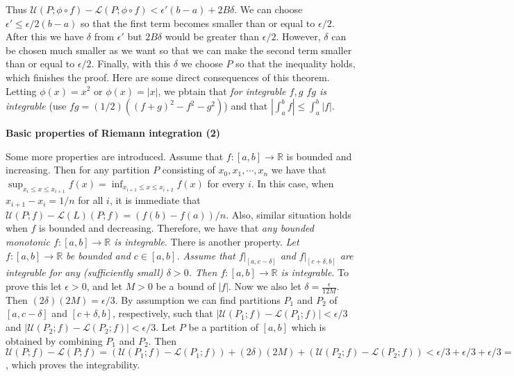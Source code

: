 \documentclass{article}
\newcommand{\ReR}{\mathbb{R}}
\begin{document}
Thus $\mathcal{U}(P; \phi \circ f) - \mathcal{L}(P; \phi \circ f) < \epsilon' (b - a) + 2B \delta$.
We can choose $\epsilon' \le \epsilon/2(b - a)$ so that the first term becomes smaller than or equal to $\epsilon/2$.
After this we have $\delta$ from $\epsilon'$ but $2B \delta$ would be greater than $\epsilon/2$.
However, $\delta$ can be chosen much smaller as we want so that we can make the second term smaller than or equal to $\epsilon/2$.
Finally, with this $\delta$ we choose $P$ so that the inequality holds, which finishes the proof.
Here are some direct consequences of this theorem.
Letting $\phi(x) = x^2$ or $\phi(x) = |x|$, we pbtain that \textit{for integrable $f, g$ $fg$ is integrable} (use $fg = (1/2)((f + g)^2 - f^2 - g^2)$) and that \textit{$|\int_a^b f| \le \int_a^b |f|$}.

\newpage

\textbf{Basic properties of Riemann integration (2)}

Some more properties are introduced.
Assume that $f : [a, b] \to \ReR$ is bounded and increasing.
Then for any partition $P$ consisting of $x_0, x_1, \cdots, x_n$ we have that $\sup_{x_i \le x \le x_{i + 1}} f(x) = \inf_{x_{i + 1} \le x \le x_{i + 2}} f(x)$ for every $i$.
In this case, when $x_{i + 1} - x_i = 1/n$ for all $i$, it is immediate that $\mathcal{U}(P; f) - \mathcal{L}(L)(P; f) = (f(b) - f(a))/n$.
Also, similar situation holds when $f$ is bounded and decreasing.
Therefore, we have that \textit{any bounded monotonic $f : [a, b] \to \ReR$ is integrable}.
There is another property.
\textit{Let $f : [a, b] \to \ReR$ be bounded and $c \in [a, b]$.
Assume that $f|_{[a, c - \delta]}$ and $f|_{[c + \delta, b]}$ are integrable for any (sufficiently small) $\delta > 0$.
Then $f : [a, b] \to \ReR$ is integrable}.
To prove this let $\epsilon > 0$, and let $M > 0$ be a bound of $|f|$.
Now we also let $\delta = \frac{\epsilon}{12M}$.
Then $(2\delta)(2M) = \epsilon/3$.
By assumption we can find partitions $P_1$ and $P_2$ of $[a, c - \delta]$ and $[c + \delta, b]$, respectively, such that $|\mathcal{U}(P_1; f) - \mathcal{L}(P_1; f)| < \epsilon/3$ and $|\mathcal{U}(P_2; f) - \mathcal{L}(P_2; f)| < \epsilon/3$.
Let $P$ be a partition of $[a, b]$ which is obtained by combining $P_1$ and $P_2$.
Then $\mathcal{U}(P; f) - \mathcal{L}(P; f) = (\mathcal{U}(P_1; f) - \mathcal{L}(P_1; f)) + (2\delta)(2M) + (\mathcal{U}(P_2; f) - \mathcal{L}(P_2; f)) < \epsilon/3 + \epsilon/3 + \epsilon/3 = \epsilon$, which proves the integrability.

\newpage
\end{document}
